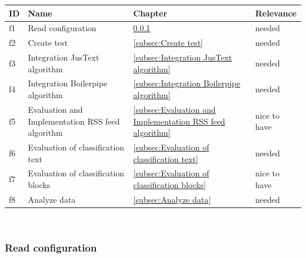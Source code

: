 	\begin{tabular}{ | p{0.5cm} | p{9cm} |p{2cm} |p{2.5cm} |}
	\hline
	\textbf{ID}	& \textbf{Name} 									& \textbf{Chapter}    											& \textbf{Relevance}	\\ \hline
	f1  		& Read configuration 								& \ref{subsec:Read configuration}  								& needed 				\\ \hline
	f2  		& Create test 										& \ref{subsec:Create test}										& needed 				\\ \hline
	f3  		& Integration JusText algorithm 					& \ref{subsec:Integration JusText algorithm} 					& needed 				\\ \hline
	f4  		& Integration Boilerpipe algorithm 					& \ref{subsec:Integration Boilerpipe algorithm}  				& needed 				\\ \hline
	f5  		& Evaluation and Implementation RSS feed algorithm 	& \ref{subsec:Evaluation and Implementation RSS feed algorithm} & nice to have			\\ \hline
	f6  		& Evaluation of classification text 				& \ref{subsec:Evaluation of classification text}				& needed 				\\ \hline
	f7  		& Evaluation of classification blocks 				& \ref{subsec:Evaluation of classification blocks}	  			& nice to have			\\ \hline
	f8  		& Analyze data 										& \ref{subsec:Analyze data}										& needed 				\\ \hline
	\end{tabular} \\



\subsubsection{Read configuration}
\label{subsec:Read configuration}

